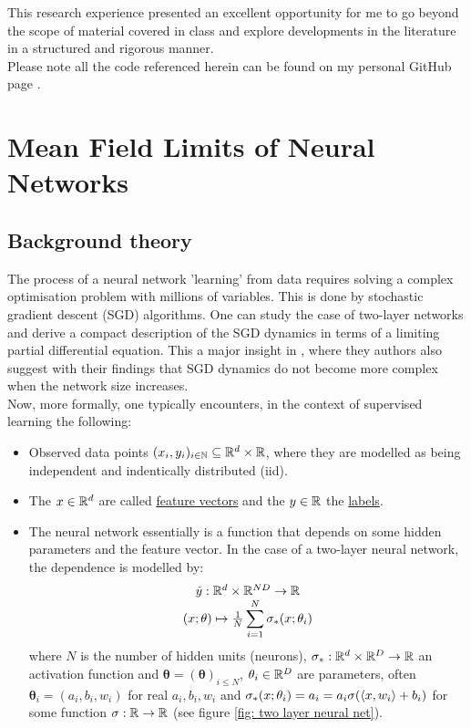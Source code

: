 \documentclass{article}
\begin{document}
This research experience presented an excellent opportunity for me to go beyond the scope of material covered in class and explore developments in the literature in a structured and rigorous manner. \\

Please note all the code referenced herein can be found on my personal GitHub page \cite{Tassopoulos_Imperial_Summer_Research_2023} . \\

\newpage
\section{Mean Field Limits of Neural Networks}

\subsection{Background theory}

The process of a neural network 'learning' from data requires solving a complex optimisation problem with millions of variables. This is done by stochastic gradient descent (SGD) algorithms. One can study the case of two-layer networks and derive a compact description of the SGD dynamics in terms of a limiting partial differential equation. This a major insight in \cite{Mei_2018}, where they authors also suggest with their findings that SGD dynamics do not become more complex when the network size increases.\\ 

Now, more formally, one typically encounters, in the context of supervised learning the following: 
\begin{itemize}
	\item Observed data points $ (x_{i},y_{i})_{i\in \mathbb{N}}\subseteq \mathbb{R}^{d}\times \mathbb{R}$, where they are modelled as being independent and indentically distributed (iid).
	\item The $ x\in \mathbb{R}^{d}$ are called \underline{feature vectors} and the $ y\in \mathbb{R}$ the \underline{labels}.
	\item The neural network essentially is a function that depends on some hidden parameters and the feature vector. In the case of a two-layer neural network, the dependence is modelled by: 
		\begin{equation}\label{eq: neural net def}
			\begin{array}{cc}
			\hat{y}:\mathbb{R}^{d}\times \mathbb{R}^{ND}\to \mathbb{R}   \\
			(x;\mathbf{\theta})\mapsto \frac{1}{N}\displaystyle\sum^{N}_{i=1}\sigma_{*}(x;\mathbf{\theta}_{i})     
	     \end{array}
     \end{equation}
		where $ N$ is the number of hidden units (neurons), $ \sigma_{*}:\mathbb{R}^{d}\times\mathbb{R}^{D}\to \mathbb{R}$ an activation function and $\mathbf{\theta} = (\mathbf{\theta})_{i\leq N}$, $\mathbf{\theta}_{i}\in \mathbb{R}^{D}$ are parameters, often $\mathbf{\theta}_{i} = (a_{i}, b_{i}, w_{i})$ for real $ a_{i}, b_{i}, w_{i}$ and $ \sigma_{*}(x;\mathbf{\theta}_{i})=a_{i}=a_{i}\sigma(\langle x, w_{i}\rangle+b_{i})$ for some function $ \sigma:\mathbb{R}\to \mathbb{R}$ (see figure \ref{fig: two layer neural net}).
\end{itemize}
\end{document}
